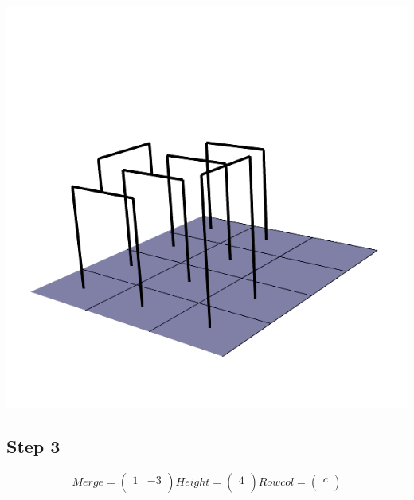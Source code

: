 \documentclass{article}
\begin{document}
\centering \includegraphics[scale=0.3]{step2}

\clearpage
\raggedright\subsection{Step 3}
\[
Merge =  \left(\begin{array}{cc}
1 & -3 \\
\end{array} \right)
%
Height = \left( \begin{array}{c}
4 \\
\end{array} \right)
%
Rowcol = \left( \begin{array}{c}
c \\
\end{array} \right)
\]  
\end{document}
